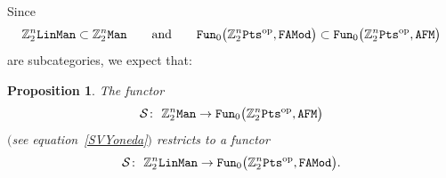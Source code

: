 \documentclass[10pt,a4paper]{amsart}
\newcommand{\op}[1]{\operatorname{#1}}
\newcommand{\Z}{{\mathbb Z}}
\newcommand{\0}{\otimes}
\newcommand{\z}{\Z_2^n}
\numberwithin{equation}{section}
\newtheorem{Proposition}[Theorem]{Proposition}
 { \theoremstyle{definition}
\newtheorem{Definition}[Theorem]{Definition}
\newtheorem{Example}[Theorem]{Example}
\newtheorem{Remark}[Theorem]{Remark} }
\begin{document}
Since
\[
\z{\tt LinMan}\subset\z{\tt Man}\qquad\text{and}\qquad{\tt Fun}_0\big(\z{\tt Pts}^{\op{op}},{\tt FAMod}\big)\subset{\tt Fun}_0\big(\z{\tt Pts}^{\op{op}},{\tt AFM}\big)
\]
are subcategories, we expect that:

\begin{Proposition}
The functor
\begin{gather*}%
\mathcal{S}\colon\ \z{\tt Man}\to{\tt Fun}_0\big(\z{\tt Pts}^{\op{op}},\tt AFM\big)
\end{gather*}
$($see equation~\eqref{SVYoneda}$)$ restricts to a functor
\begin{gather*}
\mathcal{S}\colon\ \z{\tt LinMan}\to{\tt Fun}_0\big(\z{\tt Pts}^{\op{op}},\tt FAMod\big).
\end{gather*}
\end{Proposition}
\end{document}
